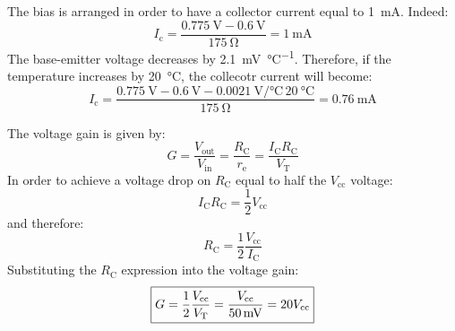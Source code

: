 The bias is arranged in order to have a collector current equal to \SI{1}{\milli\ampere}. Indeed:
\[I_\text{c}=\frac{\SI{0.775}{\volt}-\SI{0.6}{\volt}}{\SI{175}{\ohm}}=\SI{1}{\milli\ampere}\]
The base-emitter voltage decreases by \SI{2.1}{\milli\volt\per\celsius}. Therefore, if the temperature increases by \SI{20}{\celsius}, the collecotr current will become:
\[I_\text{c}=\frac{\SI{0.775}{\volt}-\SI{0.6}{\volt}-\SI{0.0021}{\volt\per\celsius}\,\SI{20}{\celsius}}{\SI{175}{\ohm}}=\SI{0.76}{\milli\ampere}\]

The voltage gain is given by:
\[G=\frac{V_\text{out}}{V_\text{in}}=\frac{R_\text{C}}{r_\text{e}}=\frac{I_\text{C}R_\text{C}}{V_\text{T}}\]
In order to achieve a voltage drop on $R_\text{C}$ equal to half the $V_\text{cc}$ voltage:
\[I_\text{C}R_\text{C}=\frac{1}{2}V_\text{cc}\]
and therefore:
\[R_\text{C}=\frac{1}{2}\frac{V_\text{cc}}{I_\text{C}}\]
Substituting the $R_\text{C}$ expression into the voltage gain:
\[\boxed{G=\frac{1}{2}\frac{V_\text{cc}}{V_\text{T}}=\frac{V_\text{cc}}{\SI{50}{\milli\volt}}=20V_\text{cc}}\]


